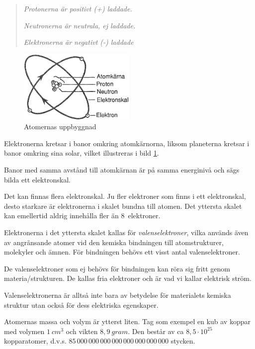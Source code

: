 \begin{quote}
\emph{Protonerna är positivt (+) laddade.}

\emph{Neutronerna är neutrala, ej laddade.}

\emph{Elektronerna är negativt (-) laddade}
\end{quote}

\begin{figure}
  \includegraphics[width=0.5\textwidth]{images/cropped_pdfs/bild_2_1-01.pdf}
  \caption{Atomernas uppbyggnad}
  \label{fig:BildII1-1}
  \vspace{-20pt}
\end{figure}

Elektronerna kretsar i banor omkring atomkärnorna, liksom
planeterna kretsar i banor omkring sina solar, vilket illustreras i bild
\ref{fig:BildII1-1}.

Banor med samma avstånd till atomkärnan är på samma energinivå och sägs bilda
ett elektronskal.

Det kan finnas flera elektronskal.
Ju fler elektroner som finns i ett elektronskal, desto starkare är elektronerna
i skalet bundna till atomen.
Det yttersta skalet kan emellertid aldrig innehålla fler än 8~elektroner.

Elektronerna i det yttersta skalet kallas för \emph{valenselektroner}, vilka
används även av angränsande atomer vid den kemiska bindningen till
atomstrukturer, molekyler och ämnen.
För bindningen behövs ett visst antal valenselektroner.

De valenselektroner som ej behövs för bindningen kan röra sig fritt genom
materia/strukturen.
De kallas fria elektroner och är vad vi kallar elektrisk ström.

Valenselektronerna är alltså inte bara av betydelse för materialets kemiska
struktur utan också för dess elektriska egenskaper.

Atomernas massa och volym är ytterst liten.
Tag som exempel en kub av koppar med volymen \(1\ cm^3\) och vikten
\(8,9\ gram\).
Den består av ca \(8,5 \cdot 10^{25}\) kopparatomer, d.v.s.
\(85\, 000\, 000\, 000\, 000\, 000\, 000\, 000\, 000\) stycken.

